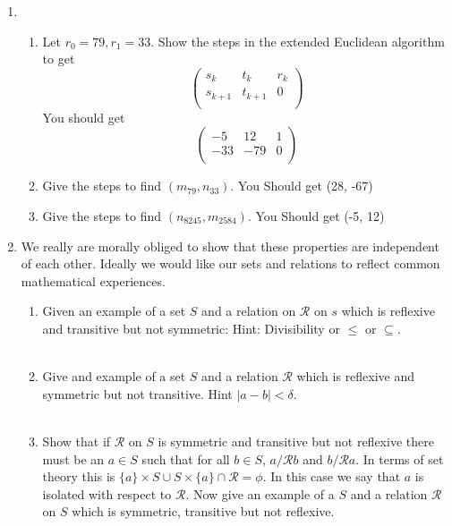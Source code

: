 \documentclass[11pt]{article}
\begin{document}
\begin{enumerate}
\newpage %
\item 
\begin{enumerate}
\item Let $r_0 = 79, r_1 = 33$.  Show the steps in the extended Euclidean algorithm to get
\begin{equation*}
\left(
\begin{array}{ccc}
s_k & t_k & r_k \\
s_{k+1} & t_{k+1} & 0 \\
\end{array} \right)
\end{equation*}
You should get
\begin{equation*}
\left(
\begin{array}{ccc}
-5 & 12 & 1 \\
-33 & -79 & 0 \\
\end{array} \right)
\end{equation*}
\item Give the steps to find $(m_{79}, n_{33})$.  You Should get (28, -67)
\item Give the steps to find $(n_{8245}, m_{2584})$.  You Should get (-5, 12)
\end{enumerate}

\newpage %
\item We really are morally obliged to show that these properties are independent of each other. Ideally we would like our sets and relations to reflect common mathematical experiences.
\begin{enumerate}
\item Given an example of a set $S$ and a relation on $\mathcal{R}$ on $s$ which is reflexive and transitive but not symmetric: Hint: Divisibility or $\leq$ or $\subseteq$.
\\
\\
\item Give and example of a set $S$ and a relation $\mathcal{R}$ which is reflexive and symmetric but not transitive. Hint $|a-b| < \delta$.
\\
\\
\item Show that if $\mathcal{R}$ on $S$ is symmetric and transitive but not reflexive there must be an $a \in S$ such that for all $b \in S$, $a /\mathcal{R} b$ and $b  /\mathcal{R} a$. In terms of set theory this is $\{a\} \times S \cup S \times \{a\} \cap \mathcal{R} = \phi$. In this case we say that $a$ is isolated with respect to $\mathcal{R}$. Now give an example of a $S$ and a relation $\mathcal{R}$ on $S$ which is symmetric, transitive but not reflexive.
\end{enumerate}


\end{enumerate}
\end{document}
